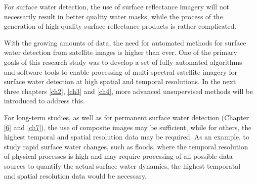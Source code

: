 For surface water detection, the use of surface reflectance imagery will not necessarily result in better quality water masks, while the process of the generation of high-quality surface reflectance products is rather complicated.

With the growing amounts of data, the need for automated methods for surface water detection from satellite images is higher than ever. One of the primary goals of this research study was to develop a set of fully automated algorithms and software tools to enable processing of multi-spectral satellite imagery for surface water detection at high spatial and temporal resolutions. In the next three chapters \ref{ch2}, \ref{ch3} and \ref{ch4}, more advanced unsupervised methods will be introduced to address this. 

For long-term studies, as well as for permanent surface water detection (Chapter \ref{6} and \ref{ch7}), the use of composite images may be sufficient, while for others, the highest temporal and spatial resolution data may be required. As an example, to study rapid surface water changes, such as floods, where the temporal resolution of physical processes is high and may require processing of all possible data sources to quantify the actual surface water dynamics, the highest temporatal and spatial resolution data would be necessary.

